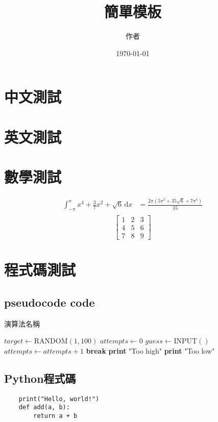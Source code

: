 \documentclass[12pt]{article}
\title{簡單模板}
\author{作者}
\date{\today}
\begin{document}
\maketitle
\tableofcontents


\section{中文測試}
\zhlipsum[1]
\section{英文測試}
\lipsum[1]
\section{數學測試}
\begin{align}
	\int_{-\pi }^{\pi } x^{4} + \frac{3}{7}x^2 + \sqrt{6}   \,\mathrm{d}x & = \frac{2 \pi (5 \pi^{2} + 35 \sqrt{6} + 7 \pi^{4})}{35} \\
\end{align}
\[
	\begin{bmatrix}
		1 & 2 & 3 \\
		4 & 5 & 6 \\
		7 & 8 & 9
	\end{bmatrix}
\]

\section{程式碼測試}
\subsection{pseudocode code}
\begin{algorithm}
	\caption{演算法名稱}\label{alg:guessnumber}
	\begin{algorithmic}[1]
		\State \(target \gets \text{RANDOM}(1, 100) \)
		\State \(attempts \gets 0\)
		\State \(guess \gets \text{INPUT}() \)
		\State \(attempts \gets attempts + 1\)
		\State \textbf{break}
		\State \textbf{print} "Too high"
		\Else
		\State \textbf{print} "Too low"
		\EndIf
		\EndWhile
	\end{algorithmic}
\end{algorithm}

\subsection{Python程式碼}
\begin{verbatim}
    print("Hello, world!")
    def add(a, b):
        return a + b
\end{verbatim}
\end{document}
